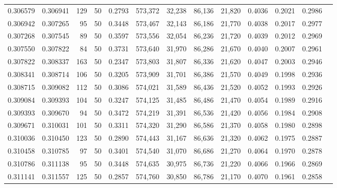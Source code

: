 \begin{tabular}{rrrrrrrrrrrrr}
0.306579 & 0.306941 &   129 &  50 &                                     0.2793 & 573,372 &  32,238 &  86,136 &  21,820 & 0.4036 & 0.2021 & 0.2986 \\
0.306942 & 0.307265 &    95 &  50 &                                     0.3448 & 573,467 &  32,143 &  86,186 &  21,770 & 0.4038 & 0.2017 & 0.2977 \\
0.307268 & 0.307545 &    89 &  50 &                                     0.3597 & 573,556 &  32,054 &  86,236 &  21,720 & 0.4039 & 0.2012 & 0.2969 \\
0.307550 & 0.307822 &    84 &  50 &                                     0.3731 & 573,640 &  31,970 &  86,286 &  21,670 & 0.4040 & 0.2007 & 0.2961 \\
0.307822 & 0.308337 &   163 &  50 &                                     0.2347 & 573,803 &  31,807 &  86,336 &  21,620 & 0.4047 & 0.2003 & 0.2946 \\
0.308341 & 0.308714 &   106 &  50 &                                     0.3205 & 573,909 &  31,701 &  86,386 &  21,570 & 0.4049 & 0.1998 & 0.2936 \\
0.308715 & 0.309082 &   112 &  50 &                                     0.3086 & 574,021 &  31,589 &  86,436 &  21,520 & 0.4052 & 0.1993 & 0.2926 \\
0.309084 & 0.309393 &   104 &  50 &                                     0.3247 & 574,125 &  31,485 &  86,486 &  21,470 & 0.4054 & 0.1989 & 0.2916 \\
0.309393 & 0.309670 &    94 &  50 &                                     0.3472 & 574,219 &  31,391 &  86,536 &  21,420 & 0.4056 & 0.1984 & 0.2908 \\
0.309671 & 0.310031 &   101 &  50 &                                     0.3311 & 574,320 &  31,290 &  86,586 &  21,370 & 0.4058 & 0.1980 & 0.2898 \\
0.310036 & 0.310450 &   123 &  50 &                                     0.2890 & 574,443 &  31,167 &  86,636 &  21,320 & 0.4062 & 0.1975 & 0.2887 \\
0.310458 & 0.310785 &    97 &  50 &                                     0.3401 & 574,540 &  31,070 &  86,686 &  21,270 & 0.4064 & 0.1970 & 0.2878 \\
0.310786 & 0.311138 &    95 &  50 &                                     0.3448 & 574,635 &  30,975 &  86,736 &  21,220 & 0.4066 & 0.1966 & 0.2869 \\
0.311141 & 0.311557 &   125 &  50 &                                     0.2857 & 574,760 &  30,850 &  86,786 &  21,170 & 0.4070 & 0.1961 & 0.2858 \\

\end{tabular}
